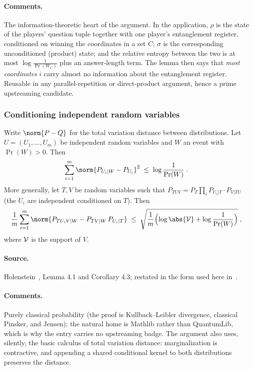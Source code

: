 \paragraph{Comments.} The information-theoretic heart of the argument. In the
application, $\rho$ is the state of the players' question tuple together with one
player's entanglement register, conditioned on winning the coordinates in a set $C$;
$\sigma$ is the corresponding unconditioned (product) state; and the relative entropy
between the two is at most $\log \frac{1}{\Pr(W_C)}$ plus an answer-length term. The
lemma then says that \emph{most coordinates} $i$ carry almost no information about the
entanglement register. Reusable in any parallel-repetition or direct-product argument,
hence a prime upstreaming candidate.

\subsubsection{Conditioning independent random variables}
\label{sec:ar-conditioning}

\effortEasy

\begin{lemma}
\label{lem:holenstein-conditioning}
Write $\norm{P - Q}$ for the total variation distance between distributions. Let $U =
(U_1, \ldots, U_m)$ be independent random variables and $W$ an event with $\Pr(W) >
0$. Then
\begin{equation*}
  \sum_{i=1}^{m} \norm{ P_{U_i | W} - P_{U_i} }^2 \;\leq\; \log \frac{1}{\Pr(W)}\;.
\end{equation*}
More generally, let $T, V$ be random variables such that $P_{TUV} = P_T \prod_i
P_{U_i | T} \cdot P_{V | TU}$ (the $U_i$ are independent conditioned on $T$). Then
\begin{equation*}
  \frac{1}{m} \sum_{i=1}^{m} \norm{ P_{T U_i V | W} - P_{T V | W} \, P_{U_i | T} }
  \;\leq\; \sqrt{ \frac{1}{m} \Bigl( \log \abs{\cal{V}} + \log \frac{1}{\Pr(W)}
  \Bigr) }\;,
\end{equation*}
where $\cal{V}$ is the support of $V$.
\end{lemma}

\paragraph{Source.} Holenstein~\cite{Hol09}, Lemma 4.1 and Corollary 4.3; restated in
the form used here in~\cite[Section 4.3]{BVY17}.

\paragraph{Comments.} Purely classical probability (the proof is Kullback--Leibler
divergence, classical Pinsker, and Jensen); the natural home is Mathlib rather than
QuantumLib, which is why the entry carries no upstreaming badge. The argument also
uses, silently, the basic calculus of total variation distance: marginalization is
contractive, and appending a shared conditional kernel to both distributions preserves
the distance.

